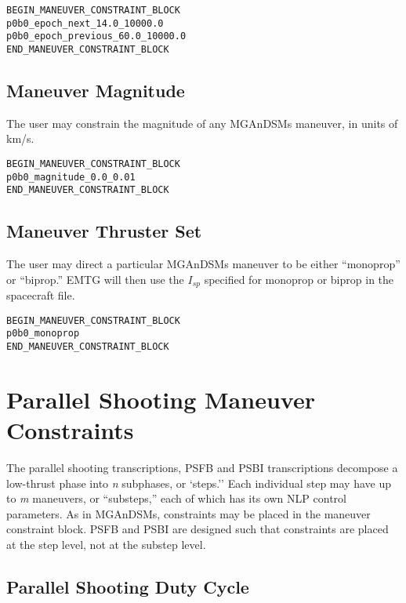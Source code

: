 \documentclass[11pt]{article}
\begin{document}
\begin{verbatim}
BEGIN_MANEUVER_CONSTRAINT_BLOCK
p0b0_epoch_next_14.0_10000.0
p0b0_epoch_previous_60.0_10000.0
END_MANEUVER_CONSTRAINT_BLOCK
\end{verbatim}


\subsection{Maneuver Magnitude}
\label{subsec:MGAnDSMs_constraintMagnitude}

The user may constrain the magnitude of any MGAnDSMs maneuver, in units of km/s.

\begin{verbatim}
BEGIN_MANEUVER_CONSTRAINT_BLOCK
p0b0_magnitude_0.0_0.01
END_MANEUVER_CONSTRAINT_BLOCK
\end{verbatim}

\subsection{Maneuver Thruster Set}
\label{subsec:MGAnDSMs_constrainThrusterSet}

The user may direct a particular MGAnDSMs maneuver to be either ``monoprop'' or ``biprop.'' EMTG will then use the $I_{sp}$ specified for monoprop or biprop in the spacecraft file.

\begin{verbatim}
BEGIN_MANEUVER_CONSTRAINT_BLOCK
p0b0_monoprop
END_MANEUVER_CONSTRAINT_BLOCK
\end{verbatim}


\section{Parallel Shooting Maneuver Constraints}
\label{subsec:PS_maneuver_constraints}

The parallel shooting transcriptions, \ac{PSFB} and \ac{PSBI} transcriptions decompose a low-thrust phase into \textit{n} subphases, or `steps.'' Each individual step may have up to \textit{m} maneuvers, or ``substeps,'' each of which has its own \ac{NLP} control parameters. As in \ac{MGAnDSMs}, constraints may be placed in the maneuver constraint block. \ac{PSFB} and \ac{PSBI} are designed such that constraints are placed at the step level, not at the substep level.

\subsection{Parallel Shooting Duty Cycle}
\label{subsec:PS_duty_cycle}
\end{document}
